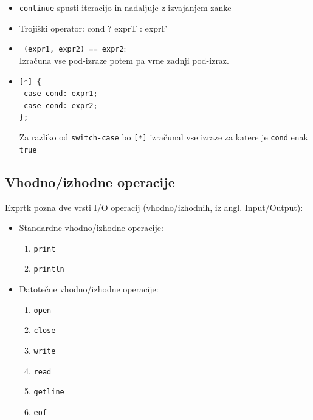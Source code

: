 \documentclass[12pt,titlepage]{report}
\newcommand{\wdot}{\textcolor{white}{.}}
\begin{document}
\begin{itemize}
			\item \texttt{continue} spusti iteracijo in nadaljuje z izvajanjem zanke
			\item Trojiški operator: cond ? exprT : exprF
			\item \texttt{~(expr1, expr2) == expr2}:\\
			Izračuna vse pod-izraze potem pa vrne zadnji pod-izraz.
			\item \parbox{\textwidth}{\vspace{5px}\texttt{[*] \{\\\wdot\qquad case cond: expr1;\\ \wdot\qquad case cond: expr2;\\\};}\vspace{5px}}
			Za razliko od \texttt{switch-case} bo \texttt{[*]} izračunal vse izraze za katere je \texttt{cond} enak \texttt{true}
		\end{itemize}
		\subsection{Vhodno/izhodne operacije}
			Exprtk pozna dve vrsti I/O operacij (vhodno/izhodnih, iz angl. Input/Output):
			\begin{itemize}
				\item Standardne vhodno/izhodne operacije:
				\begin{enumerate}
					\item \texttt{print}
					\item \texttt{println}
				\end{enumerate}
				\item Datotečne vhodno/izhodne operacije:
				\begin{multicols}{3}
				\begin{enumerate}
					\item \texttt{open}
					\item \texttt{close}
					\item \texttt{write}
					\item \texttt{read}
					\item \texttt{getline}
					\item \texttt{eof}
				\end{enumerate}
				\end{multicols}
			\end{itemize}
\end{document}

